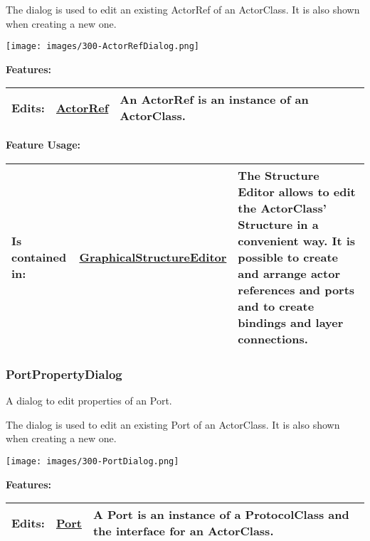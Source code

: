 	The dialog is used to edit an existing ActorRef of an ActorClass. It is also shown when creating a new one.
	\begin{center}
	\texttt{[image: images/300-ActorRefDialog.png]}
	\end{center}
		
		
	\begingroup
	\textbf{Features:}
	\renewcommand{\arraystretch}{1.8} %
	\begin{longtable}{l|l p{}}
		\hline
	Edits: & \tabitem \hyperlink{ref:ActorRef}{ActorRef}  & An ActorRef is an instance of an ActorClass.\\
	\hline
	\end{longtable}
	\endgroup
		
	\begingroup
	\textbf{Feature Usage:}
	\renewcommand{\arraystretch}{1.8} %
	\begin{longtable}{l|l p{}}
		\hline
	Is contained in: & \tabitem \hyperlink{ref:GraphicalStructureEditor}{GraphicalStructureEditor}  & The Structure Editor allows to edit the ActorClass' Structure in a convenient way. It is possible to create and arrange actor references and ports and to create bindings and layer connections.\\
	\hline
	\end{longtable}
	\endgroup
		
	
	\vspace{\baselineskip}
	\vspace{\baselineskip}
	\vspace{\baselineskip}
	
\subsubsection{PortPropertyDialog}
	\hypertarget{ref:PortPropertyDialog}{}
	A dialog to edit properties of an Port.
		
	The dialog is used to edit an existing Port of an ActorClass. It is also shown when creating a new one.
	\begin{center}
	\texttt{[image: images/300-PortDialog.png]}
	\end{center}
		
		
	\begingroup
	\textbf{Features:}
	\renewcommand{\arraystretch}{1.8} %
	\begin{longtable}{l|l p{}}
		\hline
	Edits: & \tabitem \hyperlink{ref:Port}{Port}  & A Port is an instance of a ProtocolClass and the interface for an ActorClass.\\
	\hline
	\end{longtable}
	\endgroup
		
